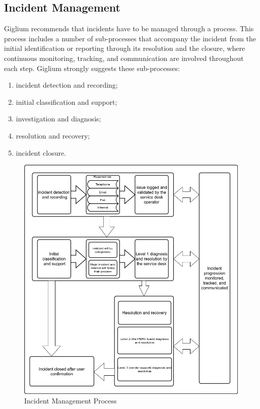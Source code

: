 \clearpage
\subsection{Incident Management}\label{incident}
Giglium recommends that incidents have to be managed through a process. This process includes a number of sub-processes that accompany the incident from the initial identification or reporting through its resolution and the closure, where continuous monitoring, tracking, and communication are involved throughout each step. Giglium strongly suggests these sub-processes:
\begin{enumerate}
	\item incident detection and recording;
	\item initial classification and support;
	\item investigation and diagnosis;
	\item resolution and recovery;
	\item incident closure.
\end{enumerate}

\begin{figure}[ht!]
	\centering
	\includegraphics[width=120mm]{./img/procedures/incident-workflow.png}
	\caption{Incident Management Process}\label{fig:incident-wrokflow}
\end{figure}

